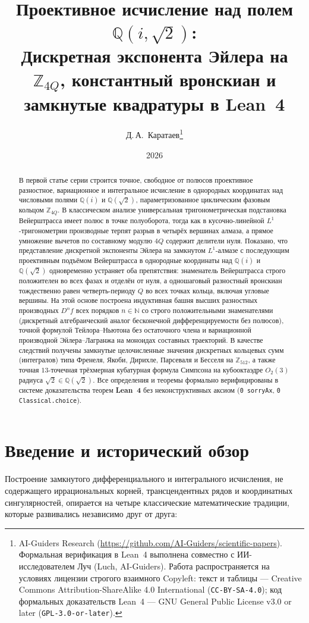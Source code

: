 \documentclass[11pt,a4paper]{article}
\title{\textbf{Проективное исчисление над полем $\mathbb{Q}(i,\sqrt{2})$:\\ Дискретная экспонента Эйлера на $\mathbb{Z}_{4Q}$, константный вронскиан и замкнутые квадратуры в Lean~4}}
\author{Д.\,А.~Каратаев\thanks{AI-Guiders Research (\url{https://github.com/AI-Guiders/scientific-papers}). Формальная верификация в Lean~4 выполнена совместно с ИИ-исследователем Луч (Luch, AI-Guiders). Работа распространяется на условиях лицензии строгого взаимного Copyleft: текст и таблицы --- Creative Commons Attribution-ShareAlike 4.0 International (\texttt{CC-BY-SA-4.0}); код формальных доказательств Lean~4 --- GNU General Public License v3.0 or later (\texttt{GPL-3.0-or-later}).}}
\date{2026}
\theoremstyle{plain}
\theoremstyle{definition}
\begin{document}
\maketitle

\begin{abstract}
В первой статье серии строится точное, свободное от полюсов проективное разностное, вариационное и интегральное исчисление в однородных координатах над числовыми полями $\mathbb{Q}(i)$ и $\mathbb{Q}(\sqrt{2})$, параметризованное циклическим фазовым кольцом $\mathbb{Z}_{4Q}$. В классическом анализе универсальная тригонометрическая подстановка Вейерштрасса имеет полюс в точке полуоборота, тогда как в кусочно-линейной $L^1$-тригонометрии производные терпят разрыв в четырёх вершинах алмаза, а прямое умножение вычетов по составному модулю $4Q$ содержит делители нуля. Показано, что представление дискретной экспоненты Эйлера на замкнутом $L^1$-алмазе с последующим проективным подъёмом Вейерштрасса в однородные координаты над $\mathbb{Q}(i)$ и $\mathbb{Q}(\sqrt{2})$ одновременно устраняет оба препятствия: знаменатель Вейерштрасса строго положителен во всех фазах и отделён от нуля, а одношаговый разностный вронскиан тождественно равен четверть-периоду $Q$ во всех точках кольца, включая угловые вершины. На этой основе построена индуктивная башня высших разностных производных $D^n f$ всех порядков $n \in \mathbb{N}$ со строго положительными знаменателями (дискретный алгебраический аналог бесконечной дифференцируемости без полюсов), точной формулой Тейлора--Ньютона без остаточного члена и вариационной производной Эйлера--Лагранжа на моноидах составных траекторий. В качестве следствий получены замкнутые целочисленные значения дискретных кольцевых сумм (интегралов) типа Френеля, Якоби, Дирихле, Парсеваля и Бесселя на $\mathbb{Z}_{512}$, а также точная $13$-точечная трёхмерная кубатурная формула Симпсона на кубооктаэдре $O_2(3)$ радиуса $\sqrt{2} \in \mathbb{Q}(\sqrt{2})$. Все определения и теоремы формально верифицированы в системе доказательства теорем \textbf{Lean~4} без неконструктивных аксиом (\texttt{0 sorryAx}, \texttt{0 Classical.choice}).
\end{abstract}

\section{Введение и исторический обзор}
\label{sec:intro}

Построение замкнутого дифференциального и интегрального исчисления, не содержащего иррациональных корней, трансцендентных рядов и координатных сингулярностей, опирается на четыре классические математические традиции, которые развивались независимо друг от друга:
\end{document}
